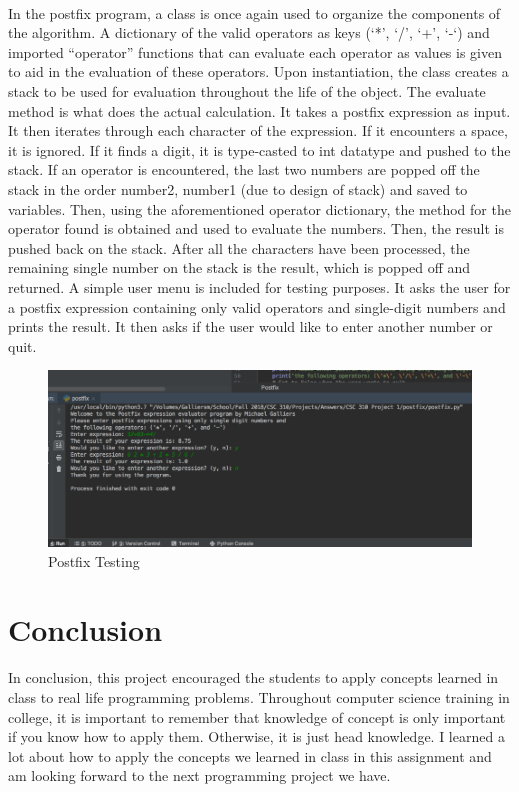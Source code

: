 \documentclass[10pt,letterpaper]{article}
\begin{document}
\paragraph{}
In the postfix program, a class is once again used to organize the components
of the algorithm. A dictionary of the valid operators as keys
(‘*’, ‘/’, ‘+’, ‘-‘) and imported “operator” functions that can evaluate each
operator as values is given to aid in the evaluation of these operators. Upon
instantiation, the class creates a stack to be used for evaluation throughout
the life of the object. The evaluate method is what does the actual
calculation. It takes a postfix expression as input. It then iterates through
each character of the expression. If it encounters a space, it is ignored. If
it finds a digit, it is type-casted to int datatype and pushed to the stack.
If an operator is encountered, the last two numbers are popped off the stack in
the order number2, number1 (due to design of stack) and saved to variables.
Then, using the aforementioned operator dictionary, the method for the operator
found is obtained and used to evaluate the numbers. Then, the result is pushed
back on the stack. After all the characters have been processed, the remaining
single number on the stack is the result, which is popped off and returned. A
simple user menu is included for testing purposes. It asks the user for a
postfix expression containing only valid operators and single-digit numbers and
prints the result. It then asks if the user would like to enter another number
or quit.

\begin{figure}[H]
\centering
\includegraphics[width=\linewidth]{postfix_testing.png}
\caption{Postfix Testing}
\end{figure}

\section{Conclusion}
In conclusion, this project encouraged the students to apply concepts learned
in class to real life programming problems. Throughout computer science
training in college, it is important to remember that knowledge of concept is
only important if you know how to apply them. Otherwise, it is just head
knowledge. I learned a lot about how to apply the concepts we learned in class
in this assignment and am looking forward to the next programming project we
have.
\end{document}
